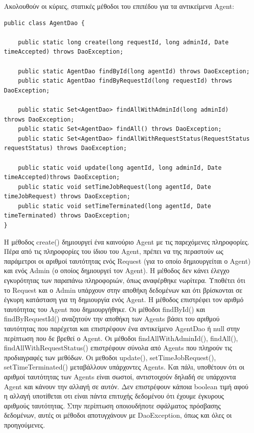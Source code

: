 \documentclass[a4paper,11pt]{article}
\begin{document}
\begin{sloppypar}
Ακολουθούν οι κύριες, στατικές μέθοδοι του επιπέδου για τα αντικείμενα Agent:

\begin{lstlisting}
public class AgentDao {

    public static long create(long requestId, long adminId, Date timeAccepted) throws DaoException;

    public static AgentDao findById(long agentId) throws DaoException;
    public static AgentDao findByRequestId(long requestId) throws DaoException;

    public static Set<AgentDao> findAllWithAdminId(long adminId) throws DaoException;
    public static Set<AgentDao> findAll() throws DaoException;
    public static Set<AgentDao> findAllWithRequestStatus(RequestStatus requestStatus) throws DaoException;

    public static void update(long agentId, long adminId, Date timeAccepted)throws DaoException;
    public static void setTimeJobRequest(long agentId, Date timeJobRequest) throws DaoException;
    public static void setTimeTerminated(long agentId, Date timeTerminated) throws DaoException;
}

\end{lstlisting}

Η μέθοδος create() δημιουργεί ένα καινούριο Agent με τις παρεχόμενες πληροφορίες. Πέρα από τις πληροφορίες του ίδιου του Agent, πρέπει να της περαστούν ως παράμετροι οι αριθμοί ταυτότητας ενός Request (για το οποίο δημιουργείται ο Agent) και ενός Admin (ο οποίος δημιουργεί τον Agent). Η μέθοδος δεν κάνει έλεγχο εγκυρότητας των παραπάνω πληροφοριών, όπως αναφέρθηκε νωρίτερα. Υποθέτει ότι το Request και ο Admin υπάρχουν στην αποθήκη δεδομένων και ότι βρίσκονται σε έγκυρη κατάσταση για τη δημιουργία ενός Agent. Η μέθοδος επιστρέφει τον αριθμό ταυτότητας του Agent που δημιουργήθηκε. Οι μέθοδοι findById() και findByRequestId() αναζητούν την αποθήκη των Agents βάσει του αριθμού ταυτότητας που παρέχεται και επιστρέφουν ένα αντικείμενο AgentDao ή null στην περίπτωση που δε βρεθεί ο Agent. Οι μέθοδοι findAllWithAdminId(), findAll(), findAllWithRequestStatus() επιστρέφουν σύνολα από Agents που πληρούν τις προδιαγραφές των μεθόδων. Οι μεθοδοι update(), setTimeJobRequest(), setTimeTerminated() μεταβάλλουν υπάρχοντες Agents. Και πάλι, υποθέτουν ότι οι αριθμοί ταυτότητας των Agents είναι σωστοί, αντιστοιχούν δηλαδή σε υπάρχοντα Agent και κάνουν την αλλαγή σε αυτόν. Δεν επιστρέφουν κάποια boolean τιμή αφού η αλλαγή υποτίθεται οτι είναι πάντα επιτυχής δεδομένου ότι έχουμε έγκυρους αριθμούς ταυτότητας. Στην περίπτωση οποιουδήποτε σφάλματος πρόσβασης δεδομένων, αυτές οι μέθοδοι αποτυγχάνουν με DaoException, όπως και όλες οι προηγούμενες.


\end{sloppypar}
\end{document}
